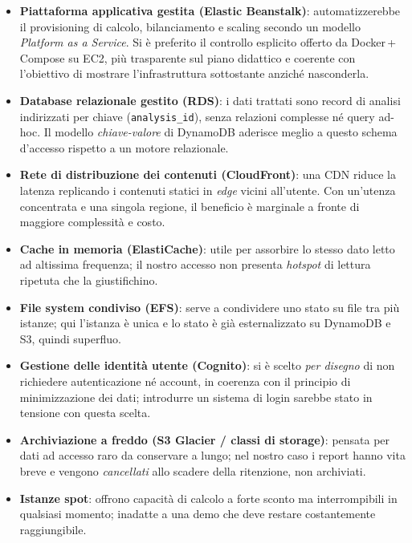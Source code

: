 \documentclass[11pt,a4paper]{article}
\begin{document}
\begin{itemize}[nosep]
  \item \textbf{Piattaforma applicativa gestita (Elastic Beanstalk)}: automatizzerebbe il
        provisioning di calcolo, bilanciamento e scaling secondo un modello \emph{Platform
        as a Service}. Si è preferito il controllo esplicito offerto da Docker\,+\,Compose
        su EC2, più trasparente sul piano didattico e coerente con l'obiettivo di mostrare
        l'infrastruttura sottostante anziché nasconderla.
  \item \textbf{Database relazionale gestito (RDS)}: i dati trattati sono record di
        analisi indirizzati per chiave (\texttt{analysis\_id}), senza relazioni complesse
        né query ad-hoc. Il modello \emph{chiave-valore} di DynamoDB aderisce meglio a
        questo schema d'accesso rispetto a un motore relazionale.
  \item \textbf{Rete di distribuzione dei contenuti (CloudFront)}: una CDN riduce la
        latenza replicando i contenuti statici in \emph{edge} vicini all'utente. Con
        un'utenza concentrata e una singola regione, il beneficio è marginale a fronte di
        maggiore complessità e costo.
  \item \textbf{Cache in memoria (ElastiCache)}: utile per assorbire lo stesso dato letto
        ad altissima frequenza; il nostro accesso non presenta \emph{hotspot} di lettura
        ripetuta che la giustifichino.
  \item \textbf{File system condiviso (EFS)}: serve a condividere uno stato su file tra
        più istanze; qui l'istanza è unica e lo stato è già esternalizzato su DynamoDB e
        S3, quindi superfluo.
  \item \textbf{Gestione delle identità utente (Cognito)}: si è scelto \emph{per disegno}
        di non richiedere autenticazione né account, in coerenza con il principio di
        minimizzazione dei dati; introdurre un sistema di login sarebbe stato in tensione
        con questa scelta.
  \item \textbf{Archiviazione a freddo (S3 Glacier / classi di storage)}: pensata per dati
        ad accesso raro da conservare a lungo; nel nostro caso i report hanno vita breve
        e vengono \emph{cancellati} allo scadere della ritenzione, non archiviati.
  \item \textbf{Istanze spot}: offrono capacità di calcolo a forte sconto ma
        interrompibili in qualsiasi momento; inadatte a una demo che deve restare
        costantemente raggiungibile.
\end{itemize}
\end{document}
